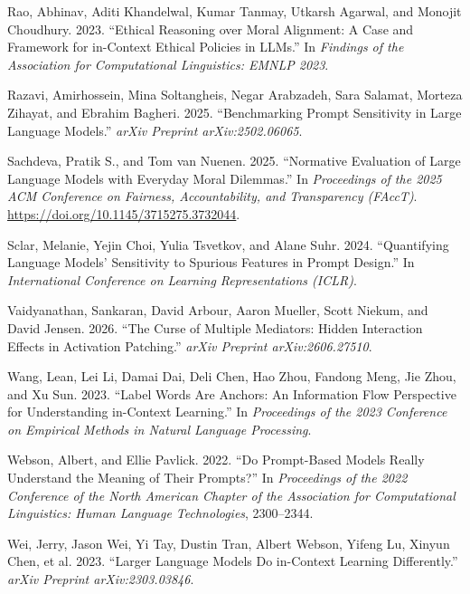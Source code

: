 \documentclass[
  11pt]{article}
\newlength{\cslhangindent}
\newenvironment{CSLReferences}[2] %
 {\begin{list}{}{%
  \setlength{\itemindent}{0pt}
  \setlength{\leftmargin}{0pt}
  \setlength{\parsep}{0pt}
  \ifodd #1
   \setlength{\leftmargin}{\cslhangindent}
   \setlength{\itemindent}{-1\cslhangindent}
  \fi
  \setlength{\itemsep}{#2\baselineskip}}}
 {\end{list}}
\begin{document}
\begin{CSLReferences}{1}{0}
Rao, Abhinav, Aditi Khandelwal, Kumar Tanmay, Utkarsh Agarwal, and
Monojit Choudhury. 2023. {``Ethical Reasoning over Moral Alignment: A
Case and Framework for in-Context Ethical Policies in LLMs.''} In
\emph{Findings of the Association for Computational Linguistics: EMNLP
2023}.

Razavi, Amirhossein, Mina Soltangheis, Negar Arabzadeh, Sara Salamat,
Morteza Zihayat, and Ebrahim Bagheri. 2025. {``Benchmarking Prompt
Sensitivity in Large Language Models.''} \emph{arXiv Preprint
arXiv:2502.06065}.

Sachdeva, Pratik S., and Tom van Nuenen. 2025. {``Normative Evaluation
of Large Language Models with Everyday Moral Dilemmas.''} In
\emph{Proceedings of the 2025 ACM Conference on Fairness,
Accountability, and Transparency (FAccT)}.
\url{https://doi.org/10.1145/3715275.3732044}.

Sclar, Melanie, Yejin Choi, Yulia Tsvetkov, and Alane Suhr. 2024.
{``Quantifying Language Models' Sensitivity to Spurious Features in
Prompt Design.''} In \emph{International Conference on Learning
Representations (ICLR)}.

Vaidyanathan, Sankaran, David Arbour, Aaron Mueller, Scott Niekum, and
David Jensen. 2026. {``The Curse of Multiple Mediators: Hidden
Interaction Effects in Activation Patching.''} \emph{arXiv Preprint
arXiv:2606.27510}.

Wang, Lean, Lei Li, Damai Dai, Deli Chen, Hao Zhou, Fandong Meng, Jie
Zhou, and Xu Sun. 2023. {``Label Words Are Anchors: An Information Flow
Perspective for Understanding in-Context Learning.''} In
\emph{Proceedings of the 2023 Conference on Empirical Methods in Natural
Language Processing}.

Webson, Albert, and Ellie Pavlick. 2022. {``Do Prompt-Based Models
Really Understand the Meaning of Their Prompts?''} In \emph{Proceedings
of the 2022 Conference of the North American Chapter of the Association
for Computational Linguistics: Human Language Technologies}, 2300--2344.

Wei, Jerry, Jason Wei, Yi Tay, Dustin Tran, Albert Webson, Yifeng Lu,
Xinyun Chen, et al. 2023. {``Larger Language Models Do in-Context
Learning Differently.''} \emph{arXiv Preprint arXiv:2303.03846}.


\end{CSLReferences}
\end{document}
